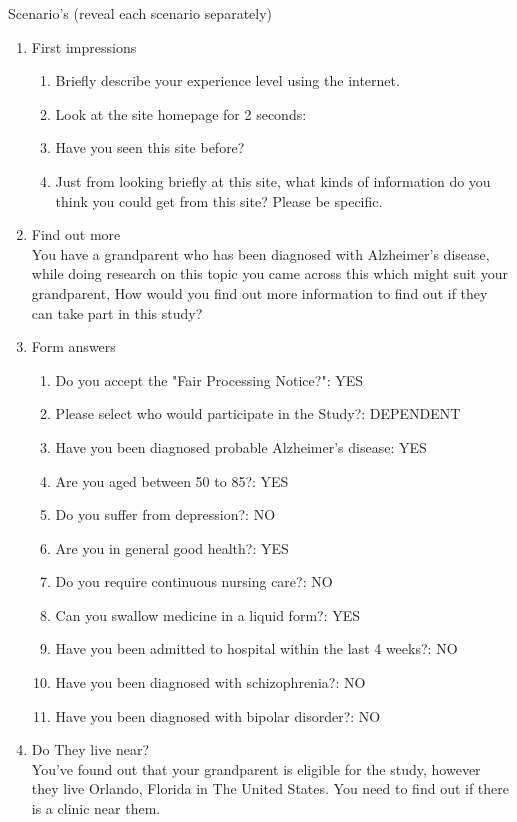 \documentclass[12pt]{article}
\begin{document}
    \large{Scenario’s (reveal each scenario separately)}
\begin{enumerate}
    \item First impressions
    \begin{enumerate}
        \item Briefly describe your experience level using the internet.
        \item Look at the site homepage for 2 seconds:
        \item Have you seen this site before?
        \item Just from looking briefly at this site, what kinds of information do you think you could get from this site? Please be specific.
    \end{enumerate}
    \item Find out more \\ You have a grandparent who has been diagnosed with Alzheimer's disease, while doing research on this topic you came across this which might suit your grandparent, How would you find out more information to find out if they can take part in this study?
    \newpage
    \item Form answers
    \begin{enumerate}
        \item Do you accept the "Fair Processing Notice?": YES
        \item Please select who would participate in the Study?: DEPENDENT
        \item Have you been diagnosed probable Alzheimer's disease: YES
        \item Are you aged between 50 to 85?: YES
        \item Do you suffer from depression?: NO
        \item Are you in general good health?: YES
        \item Do you require continuous nursing care?: NO
        \item Can you swallow medicine in a liquid form?: YES
        \item Have you been admitted to hospital within the last 4 weeks?: NO
        \item Have you been diagnosed with schizophrenia?: NO
        \item Have you been diagnosed with bipolar disorder?: NO
    \end{enumerate}
    \item Do They live near? \\ You've found out that your grandparent is eligible for the study, however they live Orlando, Florida in The United States. You need to find out if there is a clinic near them.
\end{enumerate}
\end{document}
